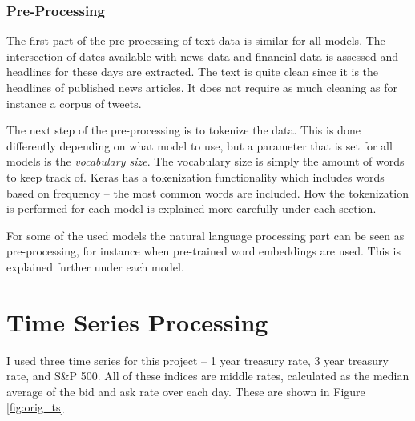 \subsubsection{Pre-Processing}

The first part of the pre-processing of text data is similar for all models. The intersection of dates available with news data and financial data is assessed and headlines for these days are extracted. The text is quite clean since it is the headlines of published news articles. It does not require as much cleaning as for instance a corpus of tweets. 

The next step of the pre-processing is to tokenize the data. This is done differently depending on what model to use, but a parameter that is set for all models is the \textit{vocabulary size}. The vocabulary size is simply the amount of words to keep track of. Keras has a tokenization functionality which includes words based on frequency -- the most common words are included. How the tokenization is performed for each model is explained more carefully under each section.

For some of the used models the natural language processing part can be seen as pre-processing, for instance when pre-trained word embeddings are used. This is explained further under each model.

\section{Time Series Processing}

I used three time series for this project -- 1 year treasury rate, 3 year treasury rate, and S\&P 500. All of these indices are middle rates, calculated as the median average of the bid and ask rate over each day. These are shown in Figure \ref{fig:orig_ts}

